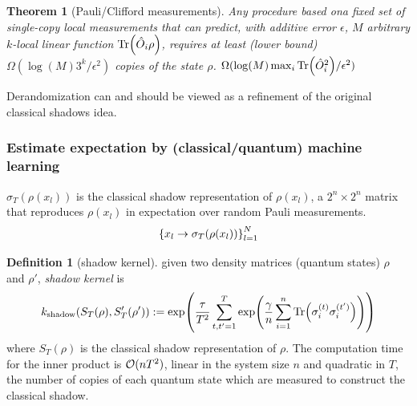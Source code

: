 \documentclass[
aps,
pra,
floatfix,
]{revtex4-2}
\theoremstyle{plain}
\newtheorem{theorem}{Theorem}
\theoremstyle{definition}
\newtheorem{definition}{Definition}
\newcommand{\ghz}{\text{GHZ}}
\newcommand{\shadow}{\textup{shadow}}
\newcommand{\ob}{\hat{O}}
\newcommand{\dm}{\rho}
\begin{document}
\begin{theorem}[Pauli/Clifford measurements]\label{thm:classical_shadow_lower}
	Any procedure based ona fixed set of single-copy local measurements that can predict,
	with additive error $\epsilon$, $M$ arbitrary $k$-local linear function $\Tr(\ob_i\dm)$,
	requires at least (lower bound)
	$\Omega(\log(M) 3^k/\epsilon^2)$ copies of the state $\dm$.
	$\Omega(\log(M) \max_i\Tr(\ob_i^2)/\epsilon^2)$ 
\end{theorem}


Derandomization can and should be viewed as a refinement of the original classical shadows idea. \cite{huangEfficientEstimationPauli2021} \cite{elbenMixedstateEntanglementLocal2020}

\subsubsection{Estimate expectation by (classical/quantum) machine learning}
\cite{huangProvablyEfficientMachine2021}
$\sigma_T(\dm(x_l))$ is the classical shadow representation of $\dm(x_l)$, 
a $2^n\times 2^n$ matrix that reproduces $\dm(x_l)$ in expectation over random Pauli measurements.
\begin{equation}
	\qty{x_l\to\sigma_T(\dm(x_l))}_{l=1}^N
\end{equation}
\begin{definition}[shadow kernel]\label{def:shadow_kernel}
	given two density matrices (quantum states) $\rho$ and $\rho'$,
	\emph{shadow kernel} \cite{huangPredictingManyProperties2020} is 
	\begin{equation}
		k_{\shadow}(S_T(\dm),S_T'(\dm')) := 
		\exp( \frac{\tau}{T^2}
			\sum_{t,t'=1}^{T} \exp( \frac{\gamma}{n} 
			\sum_{i=1}^n \Tr(\sigma_i^{(t)}\sigma_i^{(t')}) ) 
			)
	\end{equation}	
	where $S_T(\dm)$ is the classical shadow representation of $\dm$.
	The computation time for the inner product is $\mathcal{O}(nT^2)$,
	linear in the system size $n$ and quadratic in $T$,
	the number of copies of each quantum state which are measured to construct the classical shadow.
\end{definition}
\end{document}
